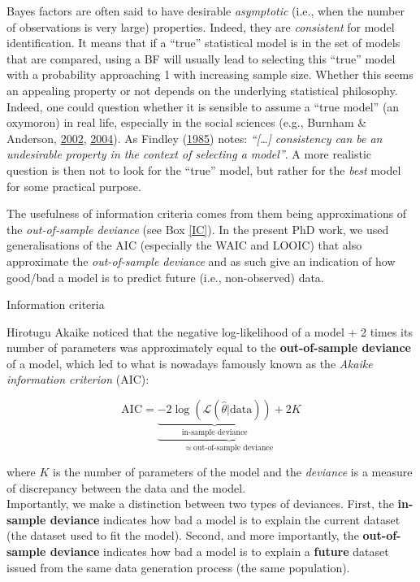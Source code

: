\documentclass[a4paper,12pt,twoside,onecolumn,openright,final,oldfontcommands]{memoir}
\begin{document}
Bayes factors are often said to have desirable \emph{asymptotic} (i.e., when the number of observations is very large) properties. Indeed, they are \emph{consistent} for model identification. It means that if a \enquote{true} statistical model is in the set of models that are compared, using a BF will usually lead to selecting this \enquote{true} model with a probability approaching 1 with increasing sample size. Whether this seems an appealing property or not depends on the underlying statistical philosophy. Indeed, one could question whether it is sensible to assume a \enquote{true model} (an oxymoron) in real life, especially in the social sciences (e.g., Burnham \& Anderson, \protect\hyperlink{ref-burnham_model_2002}{2002}, \protect\hyperlink{ref-burnham_multimodel_2004}{2004}). As Findley (\protect\hyperlink{ref-findley_unbiasedness_1985}{1985}) notes: \emph{\enquote{{[}\ldots{]} consistency can be an undesirable property in the context of selecting a model}}. A more realistic question is then not to look for the \enquote{true} model, but rather for the \emph{best} model for some practical purpose.

The usefulness of information criteria comes from them being approximations of the \emph{out-of-sample deviance} (see Box \ref{IC}). In the present PhD work, we used generalisations of the AIC (especially the WAIC and LOOIC) that also approximate the \emph{out-of-sample deviance} and as such give an indication of how good/bad a model is to predict future (i.e., non-observed) data.

\vspace{2mm}

\begin{mybox}[label = IC]{Information criteria}

Hirotugu Akaike noticed that the negative log-likelihood of a model + 2 times its number of parameters was approximately equal to the \textbf{out-of-sample deviance} of a model, which led to what is nowadays famously known as the \textit{Akaike information criterion} (AIC):

$$
\text{AIC} = \underbrace{\underbrace{-2\log(\mathcal{L}(\hat{\theta}|\text{data}))}_{\text{in-sample deviance}} + 2K}_{\approx\ \text{out-of-sample deviance}}
$$

where $K$ is the number of parameters of the model and the \textit{deviance} is a measure of discrepancy between the data and the model.\\

Importantly, we make a distinction between two types of deviances. First, the \textbf{in-sample deviance} indicates how bad a model is to explain the current dataset (the dataset used to fit the model). Second, and more importantly, the \textbf{out-of-sample deviance} indicates how bad a model is to explain a \textbf{future} dataset issued from the same data generation process (the same population).

\end{mybox}
\end{document}
